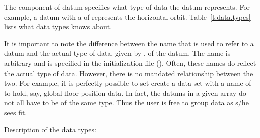 The  component of datum specifies what type of data the
datum represents. For example, a datum with a  of
 represents the horizontal orbit. Table~\ref{t:data.types} lists
what data types \tao knows about.

It is important to note the difference between the  name
that is used to refer to a datum and the actual type of data, given by
, of the datum. The  name is arbitrary and is
specified in the \tao initialization file (). Often,
these names do reflect the actual type of data. However, there is no
mandated relationship between the two. For example, it is perfectly
possible to set create a data set with a  name of
 to hold, say, global floor position data. In fact, the
datums in a given  array do not all have to be of the same
type. Thus the user is free to group data as s/he sees fit.

Description of the data types:


